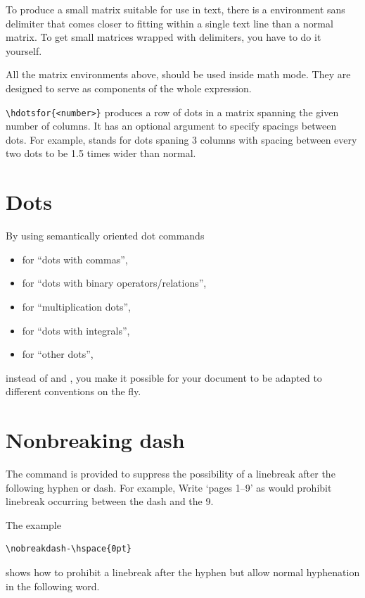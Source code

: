 \documentclass[a4paper,oneside]{book}
\newcommand{\sq}[1]{`#1'}
\newcommand{\dq}[1]{``#1''}
\newcommand{\syntax}[1]{\PVerb{#1}}
\newcommand{\envir}[1]{\PVerb{#1}}
\newcommand{\command}[1]{\PVerb{#1}}
\begin{document}
To produce a small matrix suitable for use in text, there is a \envir{smallmatrix} environment sans delimiter that comes closer to fitting within a single text line than a normal matrix. To get small matrices wrapped with delimiters, you have to do it yourself.

All the matrix environments above, should be used inside math mode. They are designed to serve as components of the whole expression.

\lstinline|\hdotsfor{<number>}| produces a row of dots in a matrix spanning the given number of columns. It has an optional argument to specify spacings between dots. For example, \syntax{\hdotsfor[1.5]{3}} stands for dots spaning 3 columns with spacing between every two dots to be 1.5 times wider than normal.


\section{Dots}
By using semantically oriented dot commands
\begin{itemize}
\item \command{\dotsc} for \dq{dots with commas},
\item \command{\dotsb} for \dq{dots with binary operators\slash relations},
\item \command{\dotsm} for \dq{multiplication dots},
\item \command{\dotsi} for \dq{dots with integrals},
\item \command{\dotso} for \dq{other dots},
\end{itemize}
instead of \command{\ldots} and \command{\cdots}, you make it possible for your document to be adapted to different conventions on the fly.

\section{Nonbreaking dash}
The command \command{\nobreakdash} is provided to suppress the possibility of a linebreak after the following hyphen or dash. For example, Write \sq{pages 1--9} as \syntax{pages 1\nobreakdash--9} would prohibit linebreak occurring between the dash and the 9.

The example
\begin{lstlisting}
\nobreakdash-\hspace{0pt}
\end{lstlisting}
shows how to prohibit a linebreak after the hyphen but allow normal hyphenation in the following word.
\end{document}
